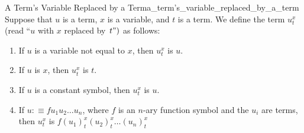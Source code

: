 \begin{definition}{A Term's Variable Replaced by a Term}{a_term's_variable_replaced_by_a_term}
    Suppose that $u$ is a term, $x$ is a variable, and $t$ is a term. We define the term $u_{t}^{x}$ (read ``$u$ with $x$ replaced by $\left.t "\right)$ as follows:
    \begin{enumerate}
        \item If $u$ is a variable not equal to $x$, then $u_{t}^{x}$ is $u$.
        \item If $u$ is $x$, then $u_{t}^{x}$ is $t$.
        \item If $u$ is a constant symbol, then $u_{t}^{x}$ is $u$.
        \item If $u: \equiv f u_{1} u_{2} \ldots u_{n}$, where $f$ is an $n$-ary function symbol and the $u_{i}$ are terms, then $u_{t}^{x}$ is $f\left(u_{1}\right)_{t}^{x}\left(u_{2}\right)_{t}^{x} \ldots\left(u_{n}\right)_{t}^{x}$
    \end{enumerate}
\end{definition}
